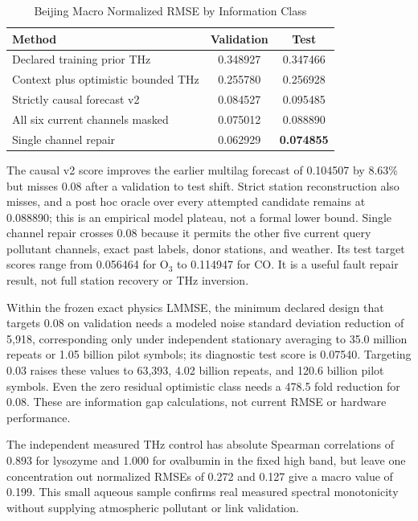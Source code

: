 \documentclass[conference]{IEEEtran}
\begin{document}
\begin{table}[t]
\caption{Beijing Macro Normalized RMSE by Information Class}
\label{tab:methods}
\centering
\small
\setlength{\tabcolsep}{3.5pt}
\begin{tabular}{lcc}
\toprule
Method & Validation & Test \\
\midrule
Declared training prior THz & 0.348927 & 0.347466 \\
Context plus optimistic bounded THz & 0.255780 & 0.256928 \\
Strictly causal forecast v2 & 0.084527 & 0.095485 \\
All six current channels masked & 0.075012 & 0.088890 \\
Single channel repair & 0.062929 & \textbf{0.074855} \\
\bottomrule
\end{tabular}
\end{table}

The causal v2 score improves the earlier multilag forecast of 0.104507 by 8.63\% but misses 0.08 after a validation to test shift. Strict station reconstruction also misses, and a post hoc oracle over every attempted candidate remains at 0.088890; this is an empirical model plateau, not a formal lower bound. Single channel repair crosses 0.08 because it permits the other five current query pollutant channels, exact past labels, donor stations, and weather. Its test target scores range from 0.056464 for O$_3$ to 0.114947 for CO. It is a useful fault repair result, not full station recovery or THz inversion.

Within the frozen exact physics LMMSE, the minimum declared design that targets 0.08 on validation needs a modeled noise standard deviation reduction of 5,918, corresponding only under independent stationary averaging to 35.0 million repeats or 1.05 billion pilot symbols; its diagnostic test score is 0.07540. Targeting 0.03 raises these values to 63,393, 4.02 billion repeats, and 120.6 billion pilot symbols. Even the zero residual optimistic class needs a 478.5 fold reduction for 0.08. These are information gap calculations, not current RMSE or hardware performance.

The independent measured THz control has absolute Spearman correlations of 0.893 for lysozyme and 1.000 for ovalbumin in the fixed high band, but leave one concentration out normalized RMSEs of 0.272 and 0.127 give a macro value of 0.199. This small aqueous sample confirms real measured spectral monotonicity without supplying atmospheric pollutant or link validation.
\end{document}
